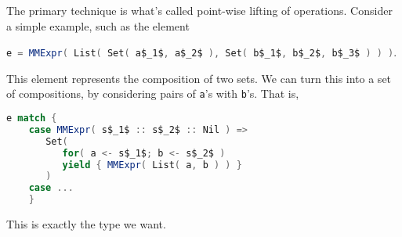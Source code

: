 The primary technique is what's called point-wise lifting of
operations. Consider a simple example, such as the element

\lstinline[language=Scala,mathescape=true]!e = MMExpr( List( Set( a$_1$, a$_2$ ), Set( b$_1$, b$_2$, b$_3$ ) ) )!.

This element represents the composition of two sets. We can turn this
into a set of compositions, by considering pairs of
\lstinline[language=Scala,mathescape=true]!a!'s with
\lstinline[language=Scala,mathescape=true]!b!'s. That is,

\begin{lstlisting}[language=Scala,mathescape=true]
  e match {
    case MMExpr( s$_1$ :: s$_2$ :: Nil ) => 
       Set(
          for( a <- s$_1$; b <- s$_2$ )
          yield { MMExpr( List( a, b ) ) }
       )
    case ...
    }
\end{lstlisting}

This is exactly the type we want.








